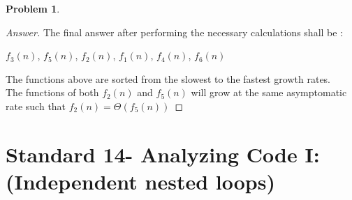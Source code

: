 \documentclass[11pt]{article}
\theoremstyle{definition}
\theoremstyle{definition}
\newtheorem{required}{Problem}
\theoremstyle{definition}
\begin{document}
\begin{required}
\begin{enumerate}[label=(\alph*)]
\begin{proof}[Answer]
The final answer after performing the necessary calculations shall be : \\
\begin{center}
$f_3(n)$, $f_5(n)$, $f_2(n)$, $f_1(n)$, $f_4(n)$, $f_6(n)$
\end{center}
The functions above are sorted from the slowest to the fastest growth rates. \\
The functions of both $f_2(n)$ and $f_5(n)$ will grow at the same asymptomatic rate such that $f_2(n) = \Theta(f_5(n))$
\end{proof}
\end{enumerate}

\end{required}

\newpage
\section{Standard 14- Analyzing Code I: (Independent nested loops)}
\end{document}
